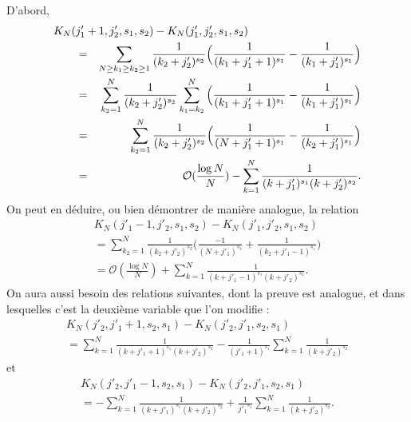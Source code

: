 \documentclass[12pt,francais, reqno]{smfart}
\numberwithin{equation}{section}
\newcommand{\gdo}{\mathcal{O}}
\begin{document}
D'abord, 
\begin{eqnarray}
\lefteqn{K_N(j'_1+1 , j'_2, s_1, s_2) - K_N(j'_1, j'_2, s_1, s_2)}\qquad \nonumber \\
&=& \sum_{N \geq k_1 \geq k_2 \geq 1} \frac{1}{(k_2+j'_2)^{s_2}} \Big(  \frac{1}{(k_1+j'_1+1)^{s_1}} -  \frac{1}{(k_1+j'_1)^{s_1}} \Big) \nonumber\\
&=& \sum_{k_2= 1} ^N  \frac{1}{(k_2+j'_2)^{s_2}}  \sum_{k_1 = k_2} ^N 
\Big(  \frac{1}{(k_1+j'_1+1)^{s_1}} -  \frac{1}{(k_1+j'_1)^{s_1}} \Big) \nonumber\\
&=& \sum_{k_2= 1} ^N  \frac{1}{(k_2+j'_2)^{s_2}}   
\Big(  \frac{1}{(N+j'_1+1)^{s_1}} -  \frac{1}{(k_2+j'_1)^{s_1}} \Big) \nonumber\\
&=& \gdo (\frac{\log N}{N}) - \sum_{k= 1} ^N  \frac{1}{(k+j'_1)^{s_1} (k+j'_2)^{s_2}}.   \label{eq7}
\end{eqnarray} 
On peut en d\'eduire, ou bien d\'emontrer de mani\`ere analogue, la relation
\begin{multline}
K_N(j'_1-1 , j'_2, s_1, s_2) - K_N(j'_1, j'_2, s_1, s_2)
\\
= \sum_{k_2= 1} ^N  \frac{1}{(k_2+j'_2)^{s_2}}   
\Big(  \frac{-1}{(N+j'_1)^{s_1}} +  \frac{1}{(k_2+j'_1-1)^{s_1}} \Big) 
\\
= \gdo (\frac{\log N}{N}) + \sum_{k= 1} ^N  \frac{1}{(k+j'_1-1)^{s_1} (k+j'_2)^{s_2}}.  \label{eq8}
\end{multline} 
On aura aussi besoin des relations suivantes, dont la preuve est analogue, et dans lesquelles c'est la deuxi\`eme variable que l'on modifie : 
\begin{multline}
K_N(j'_2, j'_1+1 , s_2, s_1) - K_N(j'_2, j'_1, s_2, s_1)   \\
= \sum_{k= 1} ^N  \frac{1}{(k+j'_1+1)^{s_1} (k+j'_2)^{s_2}} 
- \frac{1}{(j'_1+1)^{s_1}} \sum_{k=1}^N \frac{1}{(k+j'_2)^{s_2}}   \label{eq12}
\end{multline} 
et
\begin{multline}
K_N(j'_2, j'_1-1 , s_2, s_1) - K_N(j'_2, j'_1, s_2, s_1)\\
= - \sum_{k= 1} ^N  \frac{1}{(k+j'_1)^{s_1} (k+j'_2)^{s_2}} 
+ \frac{1}{{j'_1}^{s_1}} \sum_{k=1}^N \frac{1}{(k+j'_2)^{s_2}} .   \label{eq13}
\end{multline} 

\bigskip
\end{document}
